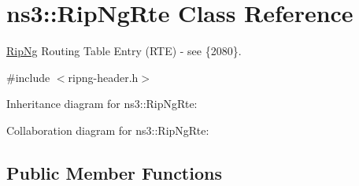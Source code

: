 \hypertarget{classns3_1_1RipNgRte}{}\section{ns3\+:\+:Rip\+Ng\+Rte Class Reference}
\label{classns3_1_1RipNgRte}


\hyperlink{classns3_1_1RipNg}{Rip\+Ng} Routing Table Entry (R\+TE) -\/ see \{2080\}.  




{\ttfamily \#include $<$ripng-\/header.\+h$>$}



Inheritance diagram for ns3\+:\+:Rip\+Ng\+Rte\+:


Collaboration diagram for ns3\+:\+:Rip\+Ng\+Rte\+:
\subsection*{Public Member Functions}
